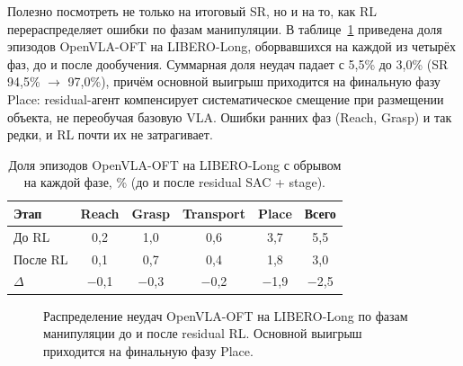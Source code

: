     Полезно посмотреть не только на итоговый SR, но и на то, как RL перераспределяет ошибки по фазам манипуляции. В таблице~\ref{tab:failure_phases} приведена доля эпизодов OpenVLA-OFT на LIBERO-Long, оборвавшихся на каждой из четырёх фаз, до и после дообучения. Суммарная доля неудач падает с 5,5\% до 3,0\% (SR 94,5\% $\to$ 97,0\%), причём основной выигрыш приходится на финальную фазу Place: residual-агент компенсирует систематическое смещение при размещении объекта, не переобучая базовую VLA. Ошибки ранних фаз (Reach, Grasp) и так редки, и RL почти их не затрагивает.

\begin{table}[htbp]
\caption{Доля эпизодов OpenVLA-OFT на LIBERO-Long с обрывом на каждой фазе, \% (до и после residual SAC + stage).}
\label{tab:failure_phases}
\centering
\footnotesize
\setlength{\tabcolsep}{6pt}
\renewcommand{\arraystretch}{1.15}
\begin{tabularx}{\textwidth}{@{}>{\raggedright\arraybackslash}Xccccc@{}}
\toprule
\textbf{Этап} & \textbf{Reach} & \textbf{Grasp} & \textbf{Transport} & \textbf{Place} & \textbf{Всего} \\
\midrule
До RL    & 0{,}2 & 1{,}0 & 0{,}6 & 3{,}7 & 5{,}5 \\
После RL & 0{,}1 & 0{,}7 & 0{,}4 & 1{,}8 & 3{,}0 \\
\midrule
$\Delta$ & $-$0{,}1 & $-$0{,}3 & $-$0{,}2 & $-$1{,}9 & $-$2{,}5 \\
\bottomrule
\end{tabularx}
\end{table}

\begin{figure}[htbp]
    \centering
    \caption{Распределение неудач OpenVLA-OFT на LIBERO-Long по фазам манипуляции до и после residual RL. Основной выигрыш приходится на финальную фазу Place.}
    \label{fig:failure_phases}
\end{figure}

